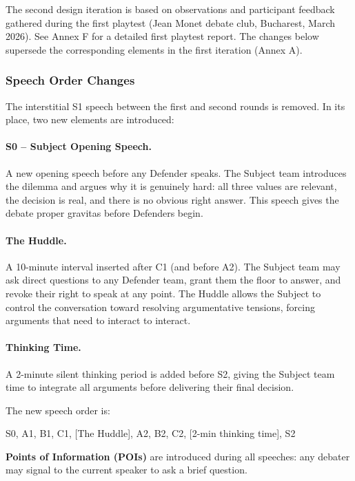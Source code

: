 \documentclass[12pt]{article}
\begin{document}
The second design iteration is based on observations and participant feedback gathered during the first playtest (Jean Monet debate club, Bucharest, March 2026). See Annex F for a detailed first playtest report. The changes below supersede the corresponding elements in the first iteration (Annex A).

\subsubsection{Speech Order Changes}

The interstitial S1 speech between the first and second rounds is removed. In its place, two new elements are introduced:

\paragraph{S0 -- Subject Opening Speech.} A new opening speech before any Defender speaks. The Subject team introduces the dilemma and argues why it is genuinely hard: all three values are relevant, the decision is real, and there is no obvious right answer. This speech gives the debate proper gravitas before Defenders begin.

\paragraph{The Huddle.} A 10-minute interval inserted after C1 (and before A2). The Subject team may ask direct questions to any Defender team, grant them the floor to answer, and revoke their right to speak at any point. The Huddle allows the Subject to control the conversation toward resolving argumentative tensions, forcing arguments that need to interact to interact.

\paragraph{Thinking Time.} A 2-minute silent thinking period is added before S2, giving the Subject team time to integrate all arguments before delivering their final decision.

The new speech order is:

\begin{center}
S0, A1, B1, C1, [The Huddle], A2, B2, C2, [2-min thinking time], S2
\end{center}

\textbf{Points of Information (POIs)} are introduced during all speeches: any debater may signal to the current speaker to ask a brief question.
\end{document}
